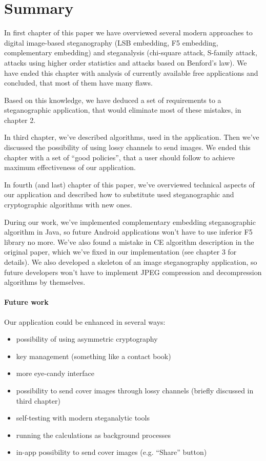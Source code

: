 \renewcommand{\chaptermark}[1]{\markboth{}{#1}}

\chapter*{Summary}
\chaptermark{\textit{\uppercase{Summary}}}

In first chapter of this paper we have overviewed several
modern approaches to digital image-based steganography (LSB embedding, F5 embedding, complementary embedding)
and steganalysis (chi-square attack, S-family attack, attacks using higher order statistics
and attacks based on Benford's law). We have  ended this chapter with analysis of currently available
free applications and concluded, that most of them have many flaws.

Based on this knowledge, we have deduced a set of requirements to a steganographic application, 
that would eliminate most of these mistakes, in chapter 2.

In third chapter, we've described algorithms, used in the application. Then we've discussed
the possibility of using lossy channels to send images. We ended this chapter with a set of
``good policies'', that a user should follow to achieve maximum effectiveness of our application.

In fourth (and last) chapter of this paper, we've overviewed technical aspects of our application and 
described how to substitute used steganographic and cryptographic algorithms with new ones.

During our work, we've implemented complementary embedding steganographic algorithm in Java,
so future Android applications won't have to use inferior F5 library no more. We've also found a mistake in CE algorithm
description in the original paper, which we've fixed in our implementation (see chapter 3 for details).
We also developed a skeleton of an image steganography application, so future developers won't have to
implement JPEG compression and decompression algorithms by themselves.

\subsubsection{Future work}
Our application could be enhanced in several ways:
\begin{itemize}
  \item possibility of using asymmetric cryptography
  \item key management (something like a contact book)
  \item more eye-candy interface
  \item possibility to send cover images through lossy channels (briefly discussed in third chapter)
  \item self-testing with modern steganalytic tools
  \item running the calculations as background processes
  \item in-app possibility to send cover images (e.g. ``Share'' button)
\end{itemize}
